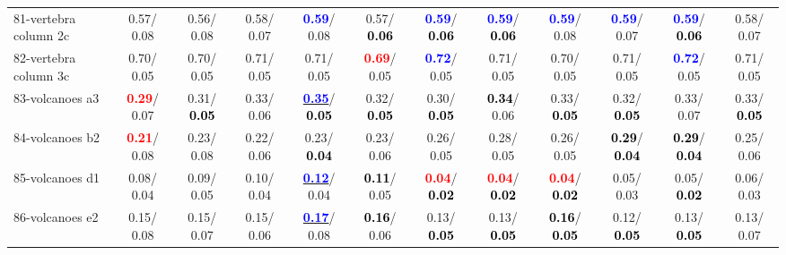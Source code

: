 \begin{table}[h]
\begin{center}
{\begin{tabular}{lc|c|c|c|c|c|c|c|c|c|c}
81-vertebra column 2c &   0.57/  0.08 &   0.56/  0.08 &   0.58/  0.07 & \textcolor{blue}{\textbf{  0.59}}/  0.08 &   0.57/\textcolor{black}{\textbf{  0.06}} & \textcolor{blue}{\textbf{  0.59}}/\textcolor{black}{\textbf{  0.06}} & \textcolor{blue}{\textbf{  0.59}}/\textcolor{black}{\textbf{  0.06}} & \textcolor{blue}{\textbf{  0.59}}/  0.08 & \textcolor{blue}{\textbf{  0.59}}/  0.07 & \textcolor{blue}{\textbf{  0.59}}/\textcolor{black}{\textbf{  0.06}} &   0.58/  0.07 \\
82-vertebra column 3c &   0.70/  0.05 &   0.70/  0.05 &   0.71/  0.05 &   0.71/  0.05 & \textcolor{red}{\textbf{  0.69}}/  0.05 & \textcolor{blue}{\textbf{  0.72}}/  0.05 &   0.71/  0.05 &   0.70/  0.05 &   0.71/  0.05 & \textcolor{blue}{\textbf{  0.72}}/  0.05 &   0.71/  0.05 \\
83-volcanoes a3 & \textcolor{red}{\textbf{  0.29}}/  0.07 &   0.31/\textcolor{black}{\textbf{  0.05}} &   0.33/  0.06 & \underline{\textcolor{blue}{\textbf{  0.35}}}/\textcolor{black}{\textbf{  0.05}} &   0.32/\textcolor{black}{\textbf{  0.05}} &   0.30/\textcolor{black}{\textbf{  0.05}} & \textcolor{black}{\textbf{  0.34}}/  0.06 &   0.33/\textcolor{black}{\textbf{  0.05}} &   0.32/\textcolor{black}{\textbf{  0.05}} &   0.33/  0.07 &   0.33/\textcolor{black}{\textbf{  0.05}} \\
84-volcanoes b2 & \textcolor{red}{\textbf{  0.21}}/  0.08 &   0.23/  0.08 &   0.22/  0.06 &   0.23/\textcolor{black}{\textbf{  0.04}} &   0.23/  0.06 &   0.26/  0.05 &   0.28/  0.05 &   0.26/  0.05 & \textcolor{black}{\textbf{  0.29}}/\textcolor{black}{\textbf{  0.04}} & \textcolor{black}{\textbf{  0.29}}/\textcolor{black}{\textbf{  0.04}} &   0.25/  0.06 \\
85-volcanoes d1 &   0.08/  0.04 &   0.09/  0.05 &   0.10/  0.04 & \underline{\textcolor{blue}{\textbf{  0.12}}}/  0.04 & \textcolor{black}{\textbf{  0.11}}/  0.05 & \textcolor{red}{\textbf{  0.04}}/\textcolor{black}{\textbf{  0.02}} & \textcolor{red}{\textbf{  0.04}}/\textcolor{black}{\textbf{  0.02}} & \textcolor{red}{\textbf{  0.04}}/\textcolor{black}{\textbf{  0.02}} &   0.05/  0.03 &   0.05/\textcolor{black}{\textbf{  0.02}} &   0.06/  0.03 \\ \hline
86-volcanoes e2 &   0.15/  0.08 &   0.15/  0.07 &   0.15/  0.06 & \underline{\textcolor{blue}{\textbf{  0.17}}}/  0.08 & \textcolor{black}{\textbf{  0.16}}/  0.06 &   0.13/\textcolor{black}{\textbf{  0.05}} &   0.13/\textcolor{black}{\textbf{  0.05}} & \textcolor{black}{\textbf{  0.16}}/\textcolor{black}{\textbf{  0.05}} &   0.12/\textcolor{black}{\textbf{  0.05}} &   0.13/\textcolor{black}{\textbf{  0.05}} &   0.13/  0.07 \\

\end{tabular}}
\end{center}
\end{table}
